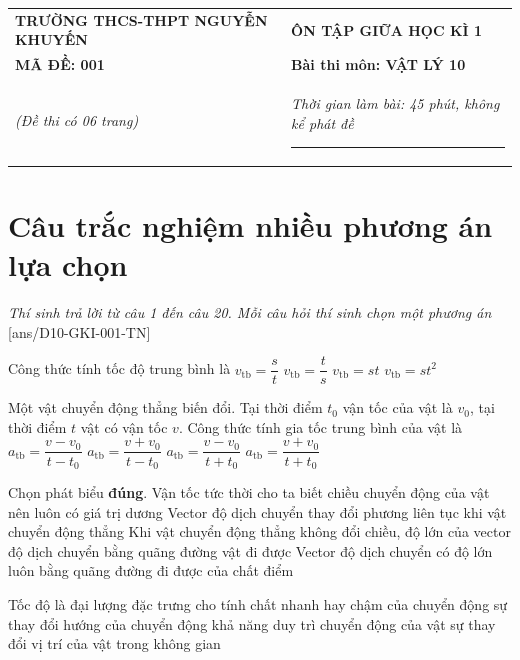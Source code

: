 \begin{center}
	\begin{tabular}{M{9.25cm}M{8.75cm}}
		\textbf{TRƯỜNG THCS-THPT NGUYỄN KHUYẾN}& \textbf{ÔN TẬP GIỮA HỌC KÌ 1}\\
		\textbf{MÃ ĐỀ: 001}& \textbf{Bài thi môn: VẬT LÝ 10}\\
		\textit{(Đề thi có 06 trang)}& \textit{Thời gian làm bài: 45 phút, không kể phát đề}
		
		\noindent\rule{4cm}{0.8pt} \\
	\end{tabular}
\end{center}
\setcounter{section}{0}
\section{Câu trắc nghiệm nhiều phương án lựa chọn}
\textit{Thí sinh trả lời từ câu 1 đến câu 20. Mỗi câu hỏi thí sinh chọn một phương án}
\setcounter{ex}{0}
[ans/D10-GKI-001-TN]
\begin{ex}
Công thức tính tốc độ trung bình là	
	\choice
	{\True $v_{\text{tb}}=\dfrac{s}{t}$}
	{$v_{\text{tb}}=\dfrac{t}{s}$}
	{$v_{\text{tb}}=st$}
	{$v_{\text{tb}}=st^2$}
	\loigiai{}
\end{ex}
\begin{ex}
Một vật chuyển động thẳng biến đổi. Tại thời điểm $t_0$ vận tốc của vật là $v_0$, tại thời điểm $t$ vật có vận tốc $v$. Công thức tính gia tốc trung bình của vật là	
	\choice
	{\True $a_{\text{tb}}=\dfrac{v-v_0}{t-t_0}$}
	{$a_{\text{tb}}=\dfrac{v+v_0}{t-t_0}$}
	{$a_{\text{tb}}=\dfrac{v-v_0}{t+t_0}$}
	{$a_{\text{tb}}=\dfrac{v+v_0}{t+t_0}$}
	\loigiai{}
\end{ex}
\begin{ex}
	Chọn phát biểu \textbf{đúng}.
	\choice
	{Vận tốc tức thời cho ta biết chiều chuyển động của vật nên luôn có giá trị dương}
	{Vector độ dịch chuyển thay đổi phương liên tục khi vật chuyển động thẳng}
	{\True Khi vật chuyển động thẳng không đổi chiều, độ lớn của vector độ dịch chuyển bằng quãng đường vật đi được}
	{Vector độ dịch chuyển có độ lớn luôn bằng quãng đường đi được của chất điểm}
	\loigiai{}
\end{ex}
\begin{ex}
	Tốc độ là đại lượng đặc trưng cho
	\choice
	{\True tính chất nhanh hay chậm của chuyển động}
	{sự thay đổi hướng của chuyển động}
	{khả năng duy trì chuyển động của vật}
	{sự thay đổi vị trí của vật trong không gian}
	\loigiai{}
\end{ex}
